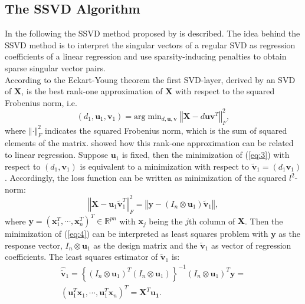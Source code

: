 \subsection{The SSVD Algorithm}
In the following the SSVD method proposed by \cite{Lee2010} is described. The idea behind the SSVD method is to interpret the singular vectors of a regular SVD as regression coefficients of a linear regression and use sparsity-inducing penalties to obtain sparse singular vector pairs.\\
According to the Eckart-Young theorem \cite{Eckart1936} the first SVD-layer, derived by an SVD of $\mathbf{X}$, is the best rank-one approximation of $\mathbf{X}$ with respect to the squared Frobenius norm, i.e. 
\begin{equation}
 (d_{1},\mathbf{u}_{1},\mathbf{v}_{1})=\text{arg} \mathop{\mbox{min}}_{d,\mathbf{u},\mathbf{v}} \left\Vert \mathbf{X} - d\mathbf{u}\mathbf{v}^{T} \right\Vert_{F}^{2},
\label{eq:3}
\end{equation}
where $\left\Vert \cdot \right\Vert_{F}^{2}$ indicates the squared Frobenius norm, which is the sum of squared elements of the matrix.
\citet{Lee2010} showed how this rank-one approximation can be related to linear regression. Suppose $\mathbf{u}_1$ is fixed, then the minimization of (\ref{eq:3}) with respect to $(d_{1},\mathbf{v}_{1})$ is equivalent to a minimization with respect to  $\mathbf{\tilde{v}}_{1}=(d_{1}\mathbf{v}_{1})$.
Accordingly, the loss function can be written as minimization of the squared $\textit{l}^{2}$-norm:
\begin{equation}\left\Vert \mathbf{X} - \mathbf{u}_{1}\mathbf{\tilde{v}}_{1}^{T}\right\Vert_{F}^{2}=
\left\Vert \mathbf{y}-(I_{n}\otimes\mathbf{u}_{1})\mathbf{\tilde{v}}_{1}\right\Vert,
\label{eq:4}
\end{equation}
where $\mathbf{y}=(\mathbf{x}_{1}^{T},\cdots,\mathbf{x}_{n}^{T})^T \in \mathbb{R}^{pn}$ with $\mathbf{x}_{j}$ being the $j$th column of $\mathbf{X}$. Then the minimization of (\ref{eq:4}) can be interpreted as least squares problem with $\mathbf{y}$ as the response vector, $I_{n}\otimes\mathbf{u}_{1}$ as the design matrix and the $\mathbf{\tilde{v}}_{1}$ as vector of regression coefficients. The least squares estimator of $\mathbf{\tilde{v}}_{1}$ is: 
\begin{equation}
\begin{split}
\mathbf{\hat{\tilde{v}}}_{1}=
\left\{(I_{n}\otimes\mathbf{u}_{1})^T(I_{n}\otimes\mathbf{u}_{1})\right\}^{-1}(I_{n}\otimes\mathbf{u}_{1})^T\mathbf{y}=\\
(\mathbf{u}_{1}^{T}\mathbf{x}_{1},\cdots,\mathbf{u}_{1}^{T}\mathbf{x}_{n})^{T}=\mathbf{X}^{T}\mathbf{u_{1}}.
\end{split}
\end{equation}
